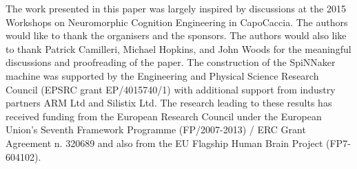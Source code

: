 \documentclass{frontiersENG} %
\begin{document}
The work presented in this paper was largely inspired by discussions at the 2015 Workshops on Neuromorphic Cognition Engineering in CapoCaccia.
The authors would like to thank the organisers and the sponsors.
The authors would also like to thank Patrick Camilleri, Michael Hopkins, and John Woods for the meaningful discussions and proofreading of the paper.
The construction of the SpiNNaker machine was supported by the Engineering and Physical Science Research Council (EPSRC grant EP/4015740/1) with additional support from industry partners ARM Ltd and Silistix Ltd.
The research leading to these results has received funding from the European Research Council under the European Union's Seventh Framework Programme (FP/2007-2013) / ERC Grant Agreement n. 320689 and also from the EU Flagship Human Brain Project (FP7-604102). 



%
\end{document}
